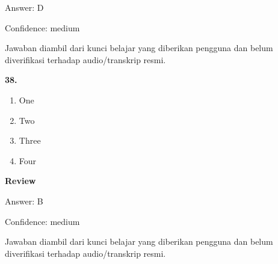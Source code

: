 \documentclass[12pt]{article}
\begin{document}
Answer: D\par
Confidence: medium\par
Jawaban diambil dari kunci belajar yang diberikan pengguna dan belum diverifikasi terhadap audio/transkrip resmi.\par
\endgroup
\par
\vspace{0.25\baselineskip}
\noindent\textbf{38.}
\begin{enumerate}[label=(\Alph*),leftmargin=*,itemsep=0.2em]
\item One
\item Two
\item Three
\item Four
\end{enumerate}
\par
\begingroup
\setlength{\parskip}{0pt}
\setlength{\parindent}{0pt}
\textbf{Review}\par
Answer: B\par
Confidence: medium\par
Jawaban diambil dari kunci belajar yang diberikan pengguna dan belum diverifikasi terhadap audio/transkrip resmi.\par
\endgroup
\par
\vspace{0.25\baselineskip}
\end{document}
